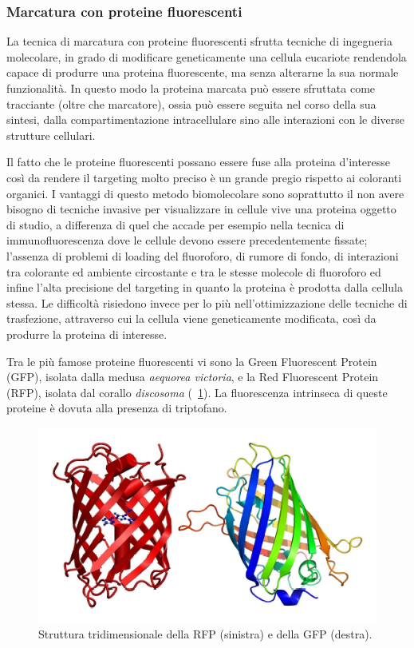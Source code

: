 \subsubsection{Marcatura con proteine fluorescenti}
La tecnica di marcatura con proteine fluorescenti sfrutta tecniche di ingegneria molecolare, in grado di modificare geneticamente una cellula eucariote rendendola capace di produrre una proteina fluorescente, ma senza alterarne la sua normale funzionalità. 
In questo modo la proteina marcata può essere sfruttata come tracciante (oltre che marcatore), ossia può essere seguita nel corso della sua sintesi, dalla compartimentazione intracellulare sino alle interazioni con le diverse strutture cellulari.

Il fatto che le proteine fluorescenti possano essere fuse alla proteina d'interesse così da rendere il targeting molto preciso è un grande pregio rispetto ai coloranti organici. 
I vantaggi di questo metodo biomolecolare sono soprattutto il non avere bisogno di tecniche invasive per visualizzare in cellule vive una proteina oggetto di studio, a differenza di quel che accade per esempio nella tecnica di immunofluorescenza dove le cellule devono essere precedentemente fissate; l'assenza di problemi di loading del fluoroforo, di rumore di fondo, di interazioni tra colorante ed ambiente circostante e tra le stesse molecole di fluoroforo ed infine l'alta precisione del targeting in quanto la proteina è prodotta dalla cellula stessa. 
Le difficoltà risiedono invece per lo più nell'ottimizzazione delle tecniche di trasfezione, attraverso cui la cellula viene geneticamente modificata, così da produrre la proteina di interesse.

Tra le più famose proteine fluorescenti vi sono la Green Fluorescent Protein (GFP), isolata dalla medusa \textit{aequorea victoria}, e la Red Fluorescent Protein (RFP), isolata dal corallo \textit{discosoma} (\figurename~\ref{fig:proteine}). 
La fluorescenza intrinseca di queste proteine è dovuta alla presenza di triptofano.

\begin{figure}
 \centering
 \includegraphics[scale=.45]{img/CAP1proteine.png}
 \caption{\small{ Struttura tridimensionale della RFP (sinistra) e della GFP (destra).}}
 \label{fig:proteine}
\end{figure}

